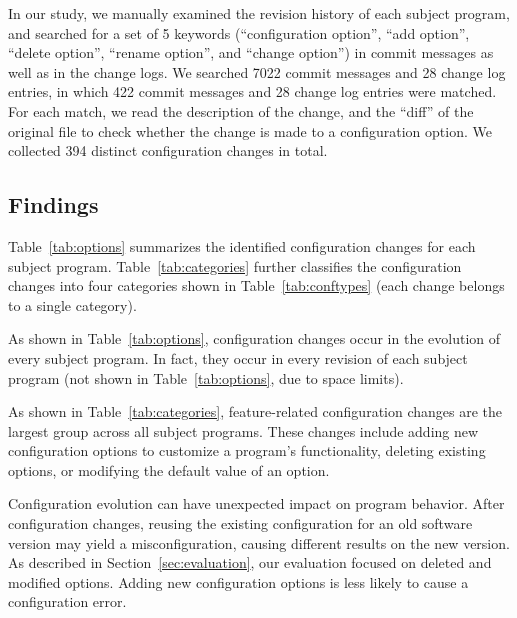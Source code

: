 In our study, %
we manually examined the revision history of each subject program,
and searched for a set of 5 keywords (``configuration option'',
``add option'', ``delete option'', ``rename option'', and ``change option'')
in commit messages as well as in the change logs.
We searched 7022 commit messages and 28 change log entries, in
which 422 commit messages and 28 change log entries were matched.
For each match, we read the description of the change,
and the ``diff'' of the original file to check whether
the change is made to a configuration option. We collected
394 distinct configuration changes in total.




\subsection{Findings}

Table~\ref{tab:options} summarizes the identified
configuration changes for each subject program.
Table~\ref{tab:categories} further classifies the
configuration changes into four categories shown
in Table~\ref{tab:conftypes} (each change belongs to a single category).


As shown in Table~\ref{tab:options}, configuration changes occur
in the evolution of every subject program. In fact, they occur in
every revision of each subject program (not shown in Table~\ref{tab:options},
due to space limits).  

As shown in Table~\ref{tab:categories},
feature-related configuration changes are the largest group across
all subject programs. These changes include
adding new configuration options to customize a program's
functionality, deleting existing options, or modifying the default
value of an option. 

Configuration evolution can have unexpected impact on
program behavior. After configuration changes, reusing
the existing configuration for an old software version
may yield a misconfiguration, causing different results
on the new version.  As described in Section~\ref{sec:evaluation},
our evaluation focused on deleted and modified options.
Adding new configuration options is less likely to cause
a configuration error.


